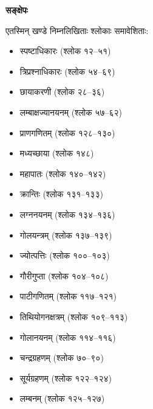 \documentclass[11pt,a4paper]{article}
\begin{document}
\begin{minipage}[t]{0.48\textwidth}
\small\devanagarifont
\textbf{सङ्क्षेपः}

एतस्मिन् खण्डे निम्नलिखिताः श्लोकाः समावेशिताः:
\begin{itemize}[leftmargin=*,nosep]
\item स्पष्टाधिकारः (श्लोक १२--५१)
\item त्रिप्रश्नाधिकारः (श्लोक ५४--६९)
\item छायाकरणी (श्लोक २८--३६)
\item लम्बाक्षज्यानयनम् (श्लोक ५७--६२)
\item प्राणगणितम् (श्लोक १२८--१३०)
\item मध्यच्छाया (श्लोक १४८)
\item महापातः (श्लोक १४०--१४२)
\item क्रान्तिः (श्लोक १३१--१३३)
\item लग्ननयनम् (श्लोक १३४--१३६)
\item गोलयन्त्रम् (श्लोक १३७--१३९)
\item ज्योत्पत्तिः (श्लोक १००--१०३)
\item गौरीगुप्ता (श्लोक १०४--१०८)
\item पाटीगणितम् (श्लोक ११७--१२१)
\item तिथियोगनक्षत्रम् (श्लोक १०९--११३)
\item गोलानयनम् (श्लोक ११४--११६)
\item चन्द्रग्रहणम् (श्लोक ७०--९०)
\item सूर्यग्रहणम् (श्लोक १२२--१२४)
\item लम्बनम् (श्लोक १२५--१२७)
\end{itemize}
\end{minipage}%
\hfill
\end{document}
